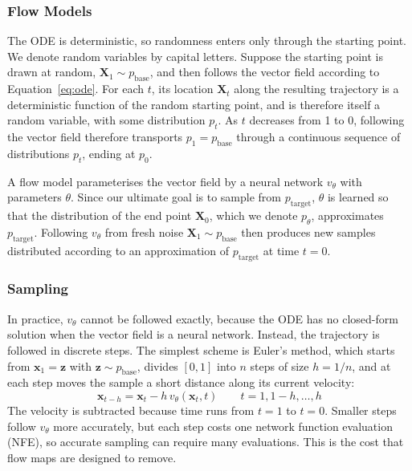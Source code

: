 \documentclass[12pt,a4paper]{report}
\begin{document}
\subsubsection{Flow Models}
\label{subsubsec:flow_models}
The ODE is deterministic, so randomness enters only through the starting point. We denote random variables by capital letters. Suppose the starting point is drawn at random, $\mathbf{X}_1\sim p_{\mathrm{base}}$, and then follows the vector field according to Equation~\ref{eq:ode}. For each $t$, its location $\mathbf{X}_t$ along the resulting trajectory is a deterministic function of the random starting point, and is therefore itself a random variable, with some distribution $p_t$. As $t$ decreases from 1 to 0, following the vector field therefore transports $p_1=p_{\mathrm{base}}$ through a continuous sequence of distributions $p_t$, ending at $p_0$.

A flow model parameterises the vector field by a neural network $v_{\theta}$ with parameters $\theta$. Since our ultimate goal is to sample from $p_{\mathrm{target}}$, $\theta$ is learned so that the distribution of the end point $\mathbf{X}_0$, which we denote $p_{\theta}$, approximates $p_{\mathrm{target}}$. Following $v_{\theta}$ from fresh noise $\mathbf{X}_1\sim p_{\mathrm{base}}$ then produces new samples distributed according to an approximation of $p_{\mathrm{target}}$ at time $t=0$.

\subsubsection{Sampling}
\label{subsubsec:sampling}
In practice, $v_{\theta}$ cannot be followed exactly, because the ODE has no closed-form solution when the vector field is a neural network. Instead, the trajectory is followed in discrete steps. The simplest scheme is Euler's method, which starts from $\mathbf{x}_1=\mathbf{z}$ with $\mathbf{z}\sim p_{\mathrm{base}}$, divides $[0,1]$ into $n$ steps of size $h=1/n$, and at each step moves the sample a short distance along its current velocity:
\begin{equation}
\mathbf{x}_{t-h}
=
\mathbf{x}_t-h\,v_{\theta}(\mathbf{x}_t,t)
\qquad
t=1,1-h,\ldots,h
\label{eq:euler}
\end{equation}
The velocity is subtracted because time runs from $t=1$ to $t=0$. Smaller steps follow $v_{\theta}$ more accurately, but each step costs one network function evaluation (NFE), so accurate sampling can require many evaluations. This is the cost that flow maps are designed to remove.
\end{document}
